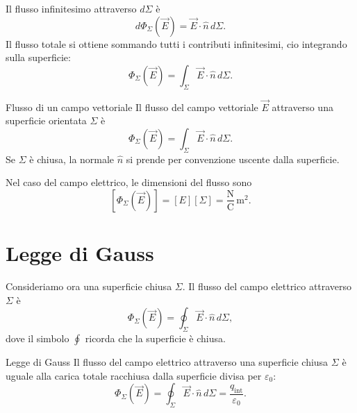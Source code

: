 \documentclass[a4paper]{article}
\begin{document}
\begin{center}
\end{center}

Il flusso infinitesimo attraverso \(d\Sigma\) è
\[
    d\Phi_\Sigma(\vec{E})=\vec{E}\cdot\hat{n}\,d\Sigma.
\]
Il flusso totale si ottiene sommando tutti i contributi infinitesimi, cio integrando sulla superficie:
\[
    \Phi_\Sigma(\vec{E})=
    \int_\Sigma \vec{E}\cdot\hat{n}\,d\Sigma.
\]

\begin{snippetdefinition}{Flusso di un campo vettoriale}
    Il flusso del campo vettoriale \(\vec{E}\) attraverso una superficie orientata \(\Sigma\) è
    \[
        \Phi_\Sigma(\vec{E})=
        \int_\Sigma \vec{E}\cdot\hat{n}\,d\Sigma.
    \]
    Se \(\Sigma\) è chiusa, la normale \(\hat{n}\) si prende per convenzione uscente dalla superficie.
\end{snippetdefinition}

Nel caso del campo elettrico, le dimensioni del flusso sono
\[
    [\Phi_\Sigma(\vec{E})]=[E][\Sigma]
    =\frac{\mathrm{N}}{\mathrm{C}}\,\mathrm{m}^2.
\]

\section{Legge di Gauss}

Consideriamo ora una superficie chiusa \(\Sigma\). Il flusso del campo elettrico attraverso \(\Sigma\) è
\[
    \Phi_\Sigma(\vec{E})=
    \oint_\Sigma \vec{E}\cdot\hat{n}\,d\Sigma,
\]
dove il simbolo \(\oint\) ricorda che la superficie è chiusa.

\begin{snippettheorem}{Legge di Gauss}
    Il flusso del campo elettrico attraverso una superficie chiusa \(\Sigma\) è uguale alla carica totale racchiusa dalla superficie divisa per \(\varepsilon_0\):
    \[
        \Phi_\Sigma(\vec{E})=
        \oint_\Sigma \vec{E}\cdot\hat{n}\,d\Sigma
        =\frac{q_{\mathrm{int}}}{\varepsilon_0}.
    \]
\end{snippettheorem}
\end{document}
